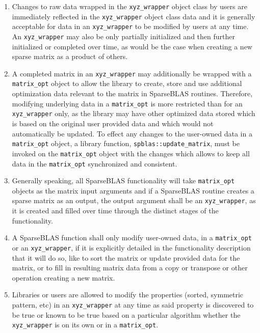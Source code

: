 \documentclass[manuscript,review]{acmart}
\begin{document}
\begin{enumerate}
    \item Changes to raw data wrapped in the \texttt{xyz\_wrapper} object class by users are immediately reflected in the \texttt{xyz\_wrapper} object class data and it is generally acceptable for data in an \texttt{xyz\_wrapper} to be modified by users at any time.  An \texttt{xyz\_wrapper} may also be only partially initialized and then further initialized or completed over time, as would be the case when creating a new sparse matrix as a product of others.
    \item A completed matrix in an \texttt{xyz\_wrapper} may additionally be wrapped with a \texttt{matrix\_opt} object to allow the library to create, store and use additional optimization data relevant to the matrix in SparseBLAS routines.  Therefore, modifying underlying data in a \texttt{matrix\_opt} is more restricted than for an \texttt{xyz\_wrapper} only, as the library may have other optimized data stored which is based on the original user provided data and which would not automatically be updated.  To effect any changes to the user-owned data in a \texttt{matrix\_opt} object, a library function, \texttt{spblas::update\_matrix}, must be invoked on the \texttt{matrix\_opt} object with the changes which allows to keep all data in the \texttt{matrix\_opt} synchronized and consistent.
    \item Generally speaking, all SparseBLAS functionality will take \texttt{matrix\_opt} objects as the matrix input arguments and if a SparseBLAS routine creates a sparse matrix as an output, the output argument shall be an \texttt{xyz\_wrapper}, as it is created and filled over time through the distinct stages of the functionality.
    \item A SparseBLAS function shall only modify user-owned data, in a \texttt{matrix\_opt} or an \texttt{xyz\_wrapper}, if it is explicitly detailed in the functionality description that it will do so, like to sort the matrix or update provided data for the matrix, or to fill in resulting matrix data from a copy or transpose or other operation creating a new matrix.
    \item Libraries or users are allowed to modify the properties (sorted, symmetric pattern, etc) in an \texttt{xyz\_wrapper} at any time as said property is discovered to be true or known to be true based on a particular algorithm whether the \texttt{xyz\_wrapper} is on its own or in a \texttt{matrix\_opt}.
\end{enumerate}
\end{document}
